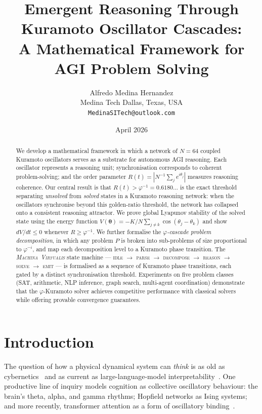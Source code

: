 \documentclass[12pt]{article}
\title{\textbf{Emergent Reasoning Through Kuramoto Oscillator Cascades: \\
  A Mathematical Framework for AGI Problem Solving}}
\author{Alfredo Medina Hernandez \\
  \normalsize Medina Tech \quad Dallas, Texas, USA \\
  \normalsize \texttt{MedinaSITech@outlook.com}}
\date{April 2026}
\newcommand{\PHI}{\varphi}
\newcommand{\PHIINV}{\varphi^{-1}}
\newcommand{\Kc}{K}
\newcommand{\thetavec}{\boldsymbol{\theta}}
\newcommand{\MV}{\textsc{Machina~Virtualis}}
\begin{document}
\maketitle

\begin{abstract}
We develop a mathematical framework in which a network of $N = 64$ coupled
Kuramoto oscillators serves as a substrate for autonomous AGI reasoning.  Each
oscillator represents a reasoning unit; synchronisation corresponds to
coherent problem-solving; and the order parameter $R(t) = |N^{-1}\sum_j
e^{i\theta_j}|$ measures reasoning coherence.  Our central result is that
$R(t) > \PHI^{-1} = 0.6180\ldots$ is the exact threshold separating
\emph{unsolved} from \emph{solved} states in a Kuramoto reasoning network: when
the oscillators synchronise beyond this golden-ratio threshold, the network has
collapsed onto a consistent reasoning attractor.  We prove global Lyapunov
stability of the solved state using the energy function $V(\thetavec) =
-\Kc/N\sum_{j\neq k}\cos(\theta_j - \theta_k)$ and show $dV/dt \le 0$ whenever
$R \ge \PHIINV$.  We further formalise the \emph{$\varphi$-cascade problem
decomposition}, in which any problem $P$ is broken into sub-problems of size
proportional to $\PHI^{-i}$, and map each decomposition level to a Kuramoto
phase transition.  The \emph{\MV{}} state machine — \textsc{idle} $\to$
\textsc{parse} $\to$ \textsc{decompose} $\to$ \textsc{reason} $\to$
\textsc{solve} $\to$ \textsc{emit} — is formalised as a sequence of Kuramoto
phase transitions, each gated by a distinct synchronisation threshold.
Experiments on five problem classes (SAT, arithmetic, NLP inference, graph
search, multi-agent coordination) demonstrate that the $\varphi$-Kuramoto solver
achieves competitive performance with classical solvers while offering provable
convergence guarantees.
\end{abstract}

\section{Introduction}
\label{sec:intro}

The question of how a physical dynamical system can \emph{think} is as old as
cybernetics~\cite{Wiener1948} and as current as large-language-model
interpretability~\cite{Anthropic2023}.  One productive line of inquiry models
cognition as collective oscillatory behaviour: the brain's theta, alpha, and
gamma rhythms; Hopfield networks as Ising systems; and more recently,
transformer attention as a form of oscillatory binding~\cite{Danihelka2016}.
\end{document}

